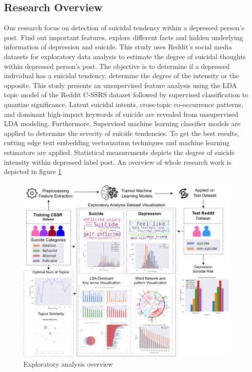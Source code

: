\documentclass[sn-mathphys,Numbered]{sn-jnl}%
\theoremstyle{thmstyleone}%
\theoremstyle{thmstyletwo}%
\theoremstyle{thmstylethree}%
\begin{document}
\subsection{Research Overview}\label{overview}
Our research focus on detection of suicidal tendency within a depressed person’s post. Find out important features, explore different facts and hidden underlying information of depression and suicide. This study uses Reddit's social media datasets for exploratory data analysis to estimate the degree of suicidal thoughts within depressed person's post. The objective is to determine if a depressed individual has a suicidal tendency, determine the degree of the intensity or the opposite. This study presents an unsupervised feature analysis using the LDA topic model of the Reddit C-SSRS dataset followed by supervised classification to quantize significance. Latent suicidal intents, cross-topic co-occurrence patterns, and dominant high-impact keywords of suicide are revealed from unsupervised LDA modeling. Furthermore, Supervised machine learning classifier models are applied to determine the severity of suicide tendencies. To get the best results, cutting edge text embedding vectorization techniques and machine learning estimators are applied. Statistical measurements depicts the degree of suicide intensity within depressed label post. An overview of whole research work is depicted in figure \ref{whole_diagram}
\begin{figure}[h!]
\centering
\includegraphics[width=\textwidth]{diagram_relation.pdf}
\caption{Exploratory analysis overview}
\label{whole_diagram}
\end{figure}
\end{document}
